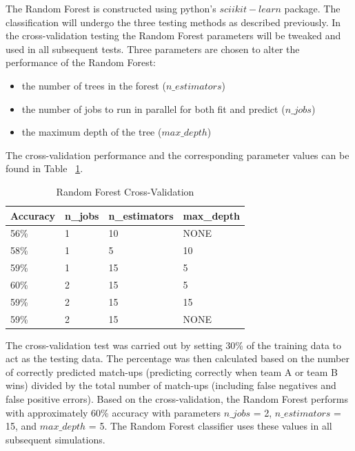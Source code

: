 \documentclass[conference]{IEEEtran}
\begin{document}
{The Random Forest is constructed using python's $sciikit-learn$ package. 
The classification will undergo the three testing methods as described previously. 
In the cross-validation testing the Random Forest parameters will be tweaked and used in all subsequent tests. 
Three parameters are chosen to alter the performance of the Random Forest:
\begin{itemize}
\item the number of trees in the forest ($n\_estimators$)
\item the number of jobs to run in parallel for both fit and predict ($n\_jobs$)
\item the maximum depth of the tree ($max\_depth$)
\end{itemize}

The cross-validation performance and the corresponding parameter values can be found in Table ~\ref{tab:RF_CV}.

\begin{table}[H]
	\centering
    \begin{tabular}{|l|l|l|l|}
    \hline
    \textbf{Accuracy} & \textbf{n\_jobs} & \textbf{n\_estimators} & \textbf{max\_depth} \\ \hline
    56\%     & 1       & 10            & NONE       \\ \hline
    58\%     & 1       & 5             & 10         \\ \hline
    59\%     & 1       & 15            & 5          \\ \hline
    60\%     & 2       & 15            & 5          \\ \hline
    59\%     & 2       & 15            & 15         \\ \hline
    59\%     & 2       & 15            & NONE       \\ \hline
    \end{tabular}
    \caption {Random Forest Cross-Validation}
    \label{tab:RF_CV}
\end{table}

The cross-validation test was carried out by setting 30\% of the training data to act as the testing data.
The percentage was then calculated based on the number of correctly predicted match-ups (predicting correctly when team A or team B wins) divided by the total number of match-ups (including false negatives and false positive errors). 
Based on the cross-validation, the Random Forest performs with approximately 60\% accuracy with parameters $n\_jobs$ = 2, $n\_estimators$ = 15, and $max\_depth$ = 5.
The Random Forest classifier uses these values in all subsequent simulations.

}
\end{document}
